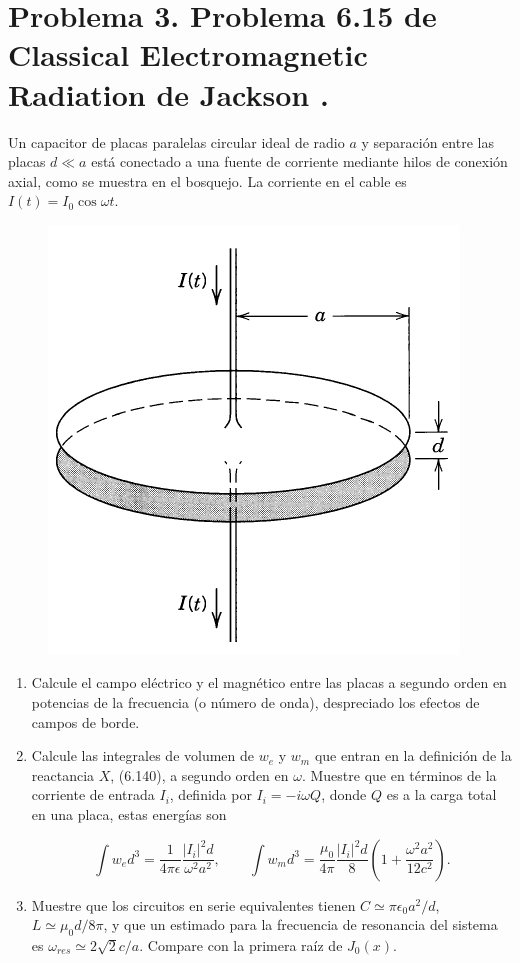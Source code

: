 \documentclass[a4paper,11pt]{article}
\numberwithin{equation}{section}
\begin{document}
\newpage

\section{Problema 3. Problema 6.15 de Classical Electromagnetic Radiation
de Jackson \cite{jackson}.}

Un capacitor de placas paralelas circular ideal de radio $a$ y separación entre 
las placas $d \ll a$ está conectado a una fuente de corriente mediante hilos de 
conexión axial, como se muestra en el bosquejo. La corriente en el cable es 
$I(t) = I_0\cos{\omega t}$.

\begin{figure}[H]
 \center 
 \includegraphics[scale=0.5]{problema3fig1}
\end{figure}

\begin{enumerate}[label=\textbf{(\alph*)}]
\item Calcule el campo eléctrico y el magnético entre las placas a segundo orden 
en potencias de la frecuencia (o número de onda), despreciado los efectos de campos 
de borde.
\item Calcule las integrales de volumen de $w_e$ y $w_m$ que entran en la definición 
de la reactancia $X$, (6.140), a segundo orden en $\omega$. Muestre que en términos 
de la corriente de entrada $I_i$, definida por $I_i = - i\omega Q$, donde $Q$ es 
a la carga total en una placa, estas energías son 

$$
\int w_e d^3 = \frac{1}{4\pi\epsilon}\frac{|I_i|^2d}{\omega^2 a^2}, \qquad 
\int w_m d^3 = \frac{\mu_0}{4\pi}\frac{|I_i|^2d}{8}\left(1 +
\frac{\omega^2 a^2}{12c^2} \right).
$$
\item Muestre que los circuitos en serie equivalentes tienen $C \simeq \pi\epsilon_0 
a^2/d$, $L \simeq \mu_0d/8\pi$, y que un estimado para la frecuencia de resonancia 
del sistema es $\omega_{res} \simeq 2\sqrt{2}c/a$. Compare con la primera raíz 
de $J_0(x)$.
\end{enumerate}
\end{document}

